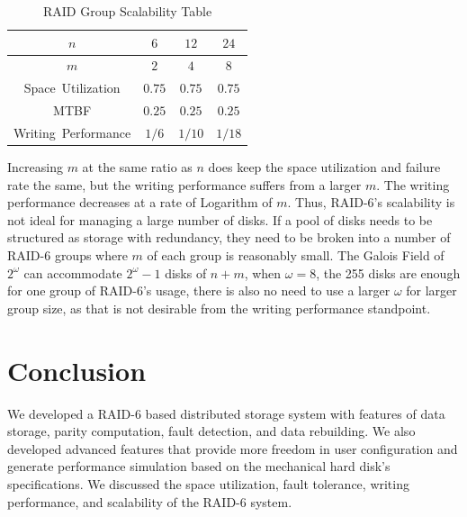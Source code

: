\documentclass[journal]{IEEEtran}
\begin{document}
\begin{table} [H]
\caption{RAID Group Scalability Table} \label{table:Scalability}
\begin{center}
\begin{tabular}{c c c c}
\toprule[1pt]
 $n$                            & $6$                               & $12$                      & $24$ \\ \hline
 $m$                            & $2$                               & $4$                       & $8$      \\ \hline
 Space\ Utilization           & $0.75$                            & $0.75$                    & $0.75$      \\
 MTBF                         & $0.25$                            & $0.25$                    & $0.25$      \\
 Writing\ Performance         & $1/6$                             & $1/10$                    & $1/18$     \\
\bottomrule[1pt]
\end{tabular}
\end{center}
\end{table}

Increasing \( m \) at the same ratio as \( n \) does keep the space utilization and failure rate the same, but the writing performance suffers from a larger \( m \). The writing performance decreases at a rate of Logarithm of \( m \). Thus, RAID-6's scalability is not ideal for managing a large number of disks. If a pool of disks needs to be structured as storage with redundancy, they need to be broken into a number of RAID-6 groups where \( m \) of each group is reasonably small. The Galois Field of \(2^{\omega}\) can accommodate \(2^{\omega} - 1\) disks of \(n + m\), when \(\omega = 8\), the 255 disks are enough for one group of RAID-6's usage, there is also no need to use a larger \(\omega\) for larger group size, as that is not desirable from the writing performance standpoint.
 

\section{Conclusion}
We developed a RAID-6 based distributed storage system with features of data storage, parity computation, fault detection, and data rebuilding. We also developed advanced features that provide more freedom in user configuration and generate performance simulation based on the mechanical hard disk's specifications. We discussed the space utilization, fault tolerance, writing performance, and scalability of the RAID-6 system.
\end{document}

